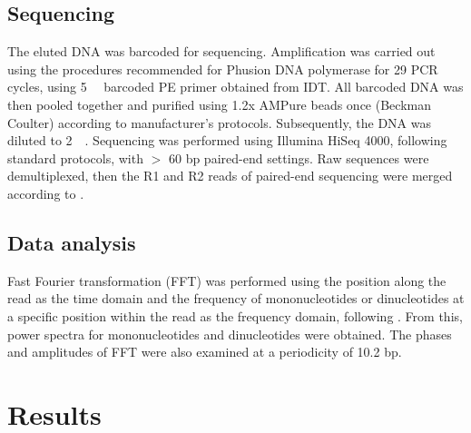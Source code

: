 \documentclass[parskip=full, numbers=noenddot]{scrreprt}
\begin{document}
\subsection{Sequencing}
\label{ssec:emsaselex_methods_seq}

The eluted DNA was barcoded for sequencing.  Amplification was carried out using the procedures recommended for Phusion DNA polymerase for 29 PCR cycles, using \SI{5}{\micro\Molar} barcoded PE primer obtained from IDT.  All barcoded DNA was then pooled together and purified using 1.2x AMPure beads once (Beckman Coulter) according to manufacturer's protocols.  Subsequently, the DNA was diluted to \SI{2}{\nano\Molar}.  Sequencing was performed using Illumina HiSeq 4000, following standard protocols, with $>$ 60 bp paired-end settings.  Raw sequences were demultiplexed, then the R1 and R2 reads of paired-end sequencing were merged according to \citet{zhu_interaction_2018}.

\subsection{Data analysis}
\label{ssec:emsaselex_methods_anal}

Fast Fourier transformation (FFT) was performed using the position along the read as the time domain and the frequency of mononucleotides or dinucleotides at a specific position within the read as the frequency domain, following \citet{zhu_interaction_2018}.  From this, power spectra for mononucleotides and dinucleotides were obtained.  The phases and amplitudes of FFT were also examined at a periodicity of 10.2 bp.

\section{Results}
\label{sec:emsaselex_results}
\end{document}
